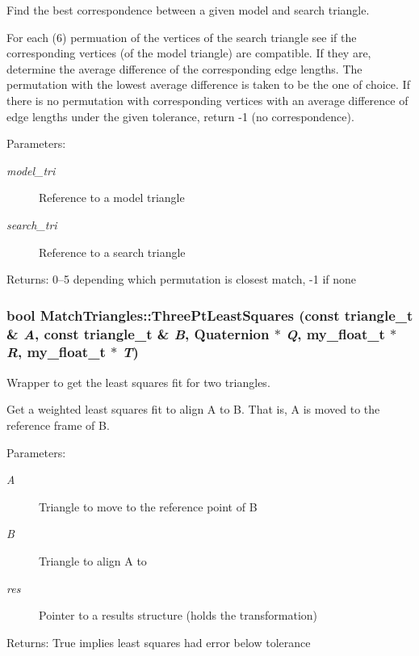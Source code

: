 Find the best correspondence between a given model and search triangle. 

For each (6) permuation of the vertices of the search triangle see if the corresponding vertices (of the model triangle) are compatible. If they are, determine the average difference of the corresponding edge lengths. The permutation with the lowest average difference is taken to be the one of choice. If there is no permutation with corresponding vertices with an average difference of edge lengths under the given tolerance, return -1 (no correspondence).

\begin{Desc}
\item[Parameters:]
\begin{description}
\item[{\em model\_\-tri}]Reference to a model triangle \item[{\em search\_\-tri}]Reference to a search triangle \end{description}
\end{Desc}
\begin{Desc}
\item[Returns:]0--5 depending which permutation is closest match, -1 if none \end{Desc}
\subsubsection{\setlength{\rightskip}{0pt plus 5cm}bool Match\-Triangles::Three\-Pt\-Least\-Squares (const \bf{triangle\_\-t} \& {\em A}, const \bf{triangle\_\-t} \& {\em B}, Quaternion $\ast$ {\em Q}, my\_\-float\_\-t $\ast$ {\em R}, my\_\-float\_\-t $\ast$ {\em T})\hspace{0.3cm}{\tt  [private]}}\label{classASCbase_1_1MatchTriangles_434d4cfe074a18dd8d79b46b5585b559}


Wrapper to get the least squares fit for two triangles. 

Get a weighted least squares fit to align A to B. That is, A is moved to the reference frame of B.

\begin{Desc}
\item[Parameters:]
\begin{description}
\item[{\em A}]Triangle to move to the reference point of B \item[{\em B}]Triangle to align A to \item[{\em res}]Pointer to a results structure (holds the transformation) \end{description}
\end{Desc}
\begin{Desc}
\item[Returns:]True implies least squares had error below tolerance \end{Desc}


